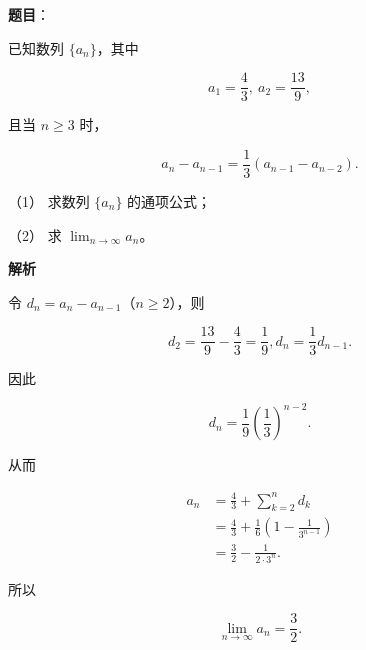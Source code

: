 \begin{answer}

\textbf{题目}：

已知数列 $\{a_n\}$，其中

\nopagebreak[4]
\[
a_1=\frac43,\ a_2=\frac{13}{9},
\]

且当 $n\ge3$ 时，

\nopagebreak[4]
\[
a_n-a_{n-1}=\frac13(a_{n-1}-a_{n-2}).
\]

（1） 求数列 $\{a_n\}$ 的通项公式；

（2） 求 $\displaystyle\lim_{n\to\infty}a_n$。

\textbf{解析}


令 $d_n=a_n-a_{n-1}$（$n\ge2$），则

\nopagebreak[4]
\[
d_2=\frac{13}{9}-\frac43=\frac19,
d_n=\frac13d_{n-1}.
\]

因此

\nopagebreak[4]
\[
d_n=\frac19\left(\frac13\right)^{n-2}.
\]

从而

\nopagebreak[4]
\[
\begin{aligned}
a_n
&=\frac43+\sum_{k=2}^n d_k\\
&=\frac43+\frac16\left(1-\frac1{3^{n-1}}\right)\\
&=\frac32-\frac{1}{2\cdot3^n}.
\end{aligned}
\]


所以

\nopagebreak[4]
\[
\lim_{n\to\infty}a_n=\frac32.
\]



\end{answer}